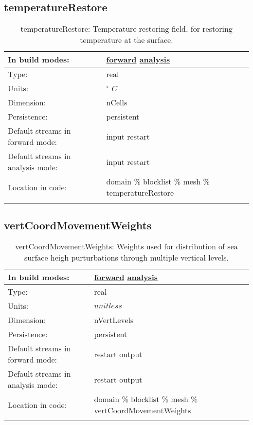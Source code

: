 \subsection[temperatureRestore]{temperatureRestore}
\label{subsec:var_sec_mesh_temperatureRestore}
\begin{center}
\begin{longtable}{| p{2.0in} | p{4.0in} |}
        \hline 
        In build modes: & \hyperref[subsec:forward_var_tab_mesh]{forward} \hyperref[subsec:analysis_var_tab_mesh]{analysis} \\
        \hline 
        Type: & real \\
        \hline 
        Units: & $^\circ$ $C$ \\
        \hline 
        Dimension: & nCells \\
        \hline 
        Persistence: & persistent \\
        \hline 
		 Default streams in forward mode: &  input restart \\
        \hline 
		 Default streams in analysis mode: &  input restart \\
        \hline 
		 Location in code: & domain \% blocklist \% mesh \% temperatureRestore \\
		 \hline 
    \caption{temperatureRestore: Temperature restoring field, for restoring temperature at the surface.}
\end{longtable}
\end{center}
\subsection[vertCoordMovementWeights]{vertCoordMovementWeights}
\label{subsec:var_sec_mesh_vertCoordMovementWeights}
\begin{center}
\begin{longtable}{| p{2.0in} | p{4.0in} |}
        \hline 
        In build modes: & \hyperref[subsec:forward_var_tab_mesh]{forward} \hyperref[subsec:analysis_var_tab_mesh]{analysis} \\
        \hline 
        Type: & real \\
        \hline 
        Units: & $unitless$ \\
        \hline 
        Dimension: & nVertLevels \\
        \hline 
        Persistence: & persistent \\
        \hline 
		 Default streams in forward mode: &  restart output \\
        \hline 
		 Default streams in analysis mode: &  restart output \\
        \hline 
		 Location in code: & domain \% blocklist \% mesh \% vertCoordMovementWeights \\
		 \hline 
    \caption{vertCoordMovementWeights: Weights used for distribution of sea surface heigh purturbations through multiple vertical levels.}
\end{longtable}
\end{center}
